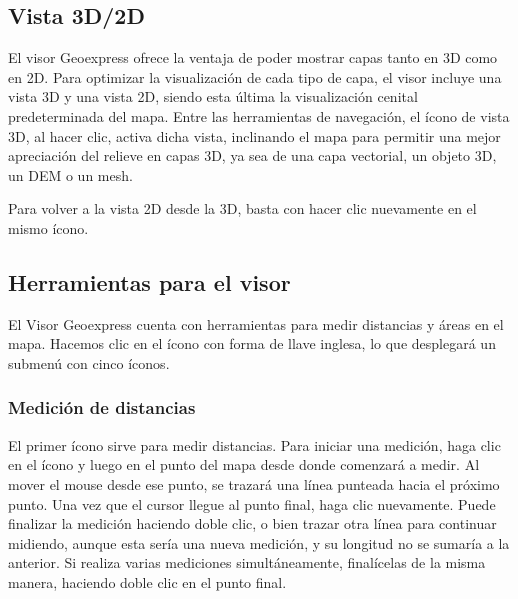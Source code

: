 \documentclass[a4paper,11pt,openany,spanish]{sphinxmanual}
\begin{document}

\sphinxstepscope


\subsection{Vista 3D/2D}
\label{\detokenize{tools/3d-2d:vista-3d-2d}}\label{\detokenize{tools/3d-2d::doc}}
\sphinxAtStartPar
El visor Geoexpress ofrece la ventaja de poder mostrar capas tanto en 3D como en 2D. Para optimizar la visualización de cada tipo de capa, el visor incluye una vista 3D y una vista 2D, siendo esta última la visualización cenital predeterminada del mapa. Entre las herramientas de navegación, el ícono de vista 3D, al hacer clic, activa dicha vista, inclinando el mapa para permitir una mejor apreciación del relieve en capas 3D, ya sea de una capa vectorial, un objeto 3D, un DEM o un mesh.

\sphinxAtStartPar
Para volver a la vista 2D desde la 3D, basta con hacer clic nuevamente en el mismo ícono.

\noindent{}

\sphinxstepscope


\subsection{Herramientas para el visor}
\label{\detokenize{tools/measuring:herramientas-para-el-visor}}\label{\detokenize{tools/measuring::doc}}

\sphinxAtStartPar
El Visor Geoexpress cuenta con herramientas para medir distancias y áreas en el mapa. Hacemos clic en el ícono con forma de llave inglesa, lo que desplegará un submenú con cinco íconos.


\subsubsection{Medición de distancias}
\label{\detokenize{tools/measuring:medicion-de-distancias}}

\sphinxAtStartPar
El primer ícono sirve para medir distancias. Para iniciar una medición, haga clic en el ícono y luego en el punto del mapa desde donde comenzará a medir. Al mover el mouse desde ese punto, se trazará una línea punteada hacia el próximo punto. Una vez que el cursor llegue al punto final, haga clic nuevamente. Puede finalizar la medición haciendo doble clic, o bien trazar otra línea para continuar midiendo, aunque esta sería una nueva medición, y su longitud no se sumaría a la anterior. Si realiza varias mediciones simultáneamente, finalícelas de la misma manera, haciendo doble clic en el punto final.
\end{document}
